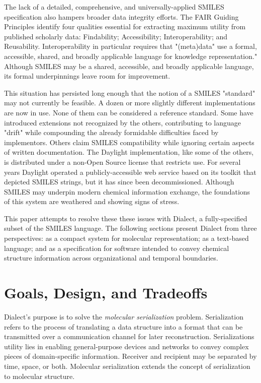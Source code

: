 \documentclass{article}
\begin{document}
The lack of a detailed, comprehensive, and universally-applied SMILES specification also hampers broader data integrity efforts. The FAIR Guiding Principles\cite{wilkinson2016} identify four qualities essential for extracting maximum utility from published scholarly data: Findability; Accessibility; Interoperability; and Reusability. Interoperability in particular requires that "(meta)data" use a formal, accessible, shared, and broadly applicable language for knowledge representation." Although SMILES may be a shared, accessible, and broadly applicable language, its formal underpinnings leave room for improvement.

This situation has persisted long enough that the notion of a SMILES "standard" may not currently be feasible. A dozen or more slightly different implementations are now in use. None of them can be considered a reference standard. Some have introduced extensions not recognized by the others, contributing to language "drift" while compounding the already formidable difficulties faced by implementors. Others claim SMILES compatibility while ignoring certain aspects of written documentation. The Daylight implementation, like some of the others, is distributed under a non-Open Source license that restricts use.\cite{daylightToolkit} For several years Daylight operated a publicly-accessible web service based on its toolkit that depicted SMILES strings, but it has since been decommissioned.\cite{depict} Although SMILES may underpin modern chemical information exchange, the foundations of this system are weathered and showing signs of stress.

This paper attempts to resolve these these issues with Dialect, a fully-specified subset of the SMILES language. The following sections present Dialect from three perspectives: as a compact system for molecular representation; as a text-based language; and as a specification for software intended to convey chemical structure information across organizational and temporal boundaries.

\section*{Goals, Design, and Tradeoffs}

Dialect's purpose is to solve the \textit{molecular serialization} problem. Serialization refers to the process of translating a data structure into a format that can be transmitted over a communication channel for later reconstruction. Serializations utility lies in enabling general-purpose devices and networks to convey complex pieces of domain-specific information. Receiver and recipient may be separated by time, space, or both. Molecular serialization extends the concept of serialization to molecular structure.
\end{document}
